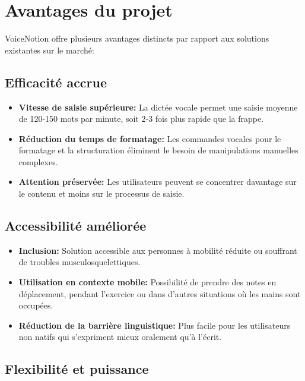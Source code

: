 \section{Avantages du projet}

VoiceNotion offre plusieurs avantages distincts par rapport aux solutions existantes sur le marché:

\subsection{Efficacité accrue}

\begin{itemize}
    \item \textbf{Vitesse de saisie supérieure:} La dictée vocale permet une saisie moyenne de 120-150 mots par minute, soit 2-3 fois plus rapide que la frappe.
    
    \item \textbf{Réduction du temps de formatage:} Les commandes vocales pour le formatage et la structuration éliminent le besoin de manipulations manuelles complexes.
    
    \item \textbf{Attention préservée:} Les utilisateurs peuvent se concentrer davantage sur le contenu et moins sur le processus de saisie.
\end{itemize}

\subsection{Accessibilité améliorée}

\begin{itemize}
    \item \textbf{Inclusion:} Solution accessible aux personnes à mobilité réduite ou souffrant de troubles musculosquelettiques.
    
    \item \textbf{Utilisation en contexte mobile:} Possibilité de prendre des notes en déplacement, pendant l'exercice ou dans d'autres situations où les mains sont occupées.
    
    \item \textbf{Réduction de la barrière linguistique:} Plus facile pour les utilisateurs non natifs qui s'expriment mieux oralement qu'à l'écrit.
\end{itemize}

\subsection{Flexibilité et puissance}

